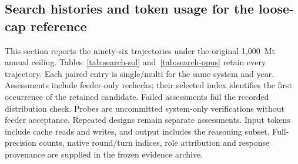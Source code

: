 \documentclass[pdflatex,sn-nature]{sn-jnl}
\begin{document}
\begin{appendices}
\section{Search histories and token usage for the loose-cap reference}\label{app:search-tokens}
\setcounter{figure}{0}
This section reports the ninety-six trajectories under the original 1,000~Mt annual ceiling.
Tables~\ref{tab:search-sol} and~\ref{tab:search-opus} retain every trajectory. Each paired entry is single/multi for the same system and year. Assessments include feeder-only rechecks; their selected index identifies the first occurrence of the retained candidate. Failed assessments fail the recorded distribution check. Probes are uncommitted system-only verifications without feeder acceptance. Repeated designs remain separate assessments. Input tokens include cache reads and writes, and output includes the reasoning subset. Full-precision counts, native round/turn indices, role attribution and response provenance are supplied in the frozen evidence archive.


\end{appendices}
\end{document}
